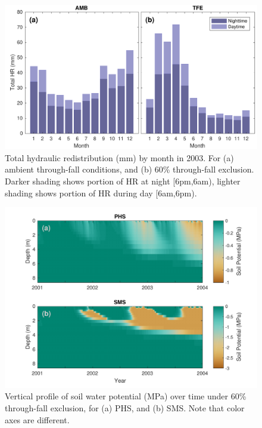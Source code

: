 \documentclass[draft,linenumbers]{agujournal}
\begin{document}
    \clearpage
    \begin{figure}[h]
     \centering
     \includegraphics[width=30pc]{../figs2/fig9.pdf}
     \caption{Total hydraulic redistribution (mm) by month in 2003. For (a) ambient through-fall conditions, and (b) 60\% through-fall exclusion. 
     Darker shading shows portion of HR at night [6pm,6am), lighter shading shows portion of HR during day [6am,6pm).}
     \label{fig:hr}
  \end{figure}

  
      \clearpage
    \begin{figure}[h]
     \centering
     \includegraphics[width=30pc]{../figs2/fig11.pdf}
     \caption{Vertical profile of soil water potential (MPa) over time under 60\% through-fall exclusion, for
     (a) PHS, and 
     (b) SMS.
     Note that color axes are different. }
     \label{fig:sm}
  \end{figure}
\end{document}
